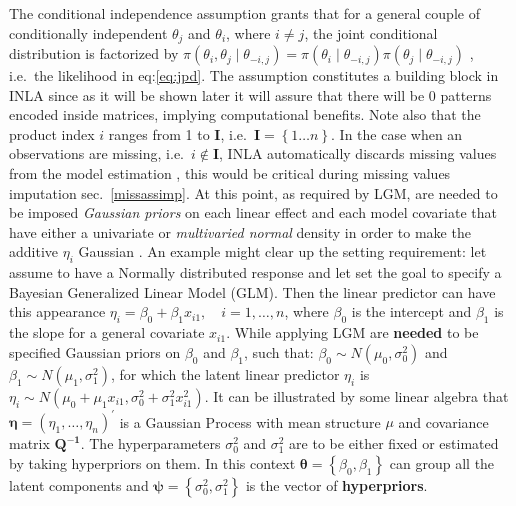 \documentclass[
  12pt,
  a4paper,
  oneside]{book}
\theoremstyle{definition}
\theoremstyle{definition}
\theoremstyle{definition}
\theoremstyle{remark}
\begin{document}
The conditional independence assumption grants that for a general couple of conditionally independent \(\theta_j\) and \(\theta_i\), where \(i \neq j\), the joint conditional distribution is factorized by \(\pi\left(\theta_{i}, \theta_{j} \mid \theta_{-i, j}\right)=\pi\left(\theta_{i} \mid \theta_{-i, j}\right) \pi\left(\theta_{j} \mid \theta_{-i, j}\right)\) \citep{Blangiardo-Cameletti}, i.e.~the likelihood in eq:\eqref{eq:jpd}. The assumption constitutes a building block in INLA since as it will be shown later it will assure that there will be 0 patterns encoded inside matrices, implying computational benefits.
Note also that the product index \(i\) ranges from 1 to \(\mathbf{I}\), i.e.~\(\mathbf{I} = \left\{1 \ldots n \right\}\). In the case when an observations are missing, i.e.~\(i \notin \mathbf{I}\), INLA automatically discards missing values from the model estimation \citeyearpar{Bayesian_INLA_Rubio}, this would be critical during missing values imputation sec.~\ref{missassimp}.
At this point, as required by LGM, are needed to be imposed \emph{Gaussian priors} on each linear effect and each model covariate that have either a univariate or \emph{multivaried normal} density in order to make the additive \(\eta_i\) Gaussian \citeyearpar{wang2018bayesian}.
An example might clear up the setting requirement: let assume to have a Normally distributed response and let set the goal to specify a Bayesian Generalized Linear Model (GLM). Then the linear predictor can have this appearance \(\eta_{i}=\beta_{0}+\beta_{1} x_{i 1}, \quad i=1, \ldots, n\), where \(\beta_{0}\) is the intercept and \(\beta_{1}\) is the slope for a general covariate \(x_{i1}\). While applying LGM are \textbf{needed} to be specified Gaussian priors on \(\beta_{0}\) and \(\beta_{1}\), such that: \(\beta_{0} \sim N\left(\mu_{0}, \sigma_{0}^{2}\right)\) and \(\beta_{1} \sim N\left(\mu_{1}, \sigma_{1}^{2}\right)\), for which the latent linear predictor \(\eta_i\) is \(\eta_{i} \sim N\left(\mu_{0}+\mu_{1} x_{i 1}, \sigma_{0}^{2}+\sigma_{1}^{2} x_{i 1}^{2}\right)\). It can be illustrated by some linear algebra \citeyearpar{wang2018bayesian} that \(\boldsymbol{\eta}=\left(\eta_{1}, \ldots, \eta_{n}\right)^{\prime}\) is a Gaussian Process with mean structure \(\mu\) and covariance matrix \(\boldsymbol{Q^{-1}}\). The hyperparameters \(\sigma_{0}^{2}\) and
\(\sigma_{1}^{2}\) are to be either fixed or estimated by taking hyperpriors on them. In this context \(\boldsymbol{\theta}=\left\{\beta_{0}, \beta_{1}\right\}\) can group all the latent components and \(\boldsymbol{\psi} = \left\{\sigma_{0}^{2},\sigma_{1}^{2}\right\}\) is the vector of \textbf{hyperpriors}.
\end{document}
